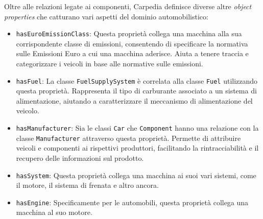 Oltre alle relazioni legate ai componenti, Carpedia definisce diverse altre \textit{object properties} che catturano vari aspetti del dominio automobilistico:

\begin{itemize}
    \item \texttt{hasEuroEmissionClass}: Questa proprietà collega una macchina alla sua corrispondente classe di emissioni, consentendo di specificare la normativa sulle Emissioni Euro a cui una macchina aderisce. Aiuta a tenere traccia e categorizzare i veicoli in base alle normative sulle emissioni.
    \item \texttt{hasFuel}: La classe \texttt{FuelSupplySystem} è correlata alla classe \texttt{Fuel} utilizzando questa proprietà. Rappresenta il tipo di carburante associato a un sistema di alimentazione, aiutando a caratterizzare il meccanismo di alimentazione del veicolo.
    \item \texttt{hasManufacturer}: Sia le classi \texttt{Car} che \texttt{Component} hanno una relazione con la classe \texttt{Manufacturer} attraverso questa proprietà. Permette di attribuire veicoli e componenti ai rispettivi produttori, facilitando la rintracciabilità e il recupero delle informazioni sul prodotto.
    \item \texttt{hasSystem}: Questa proprietà collega una macchina ai suoi vari sistemi, come il motore, il sistema di frenata e altro ancora.
    \item \texttt{hasEngine}: Specificamente per le automobili, questa proprietà collega una macchina al suo motore.
\end{itemize}
